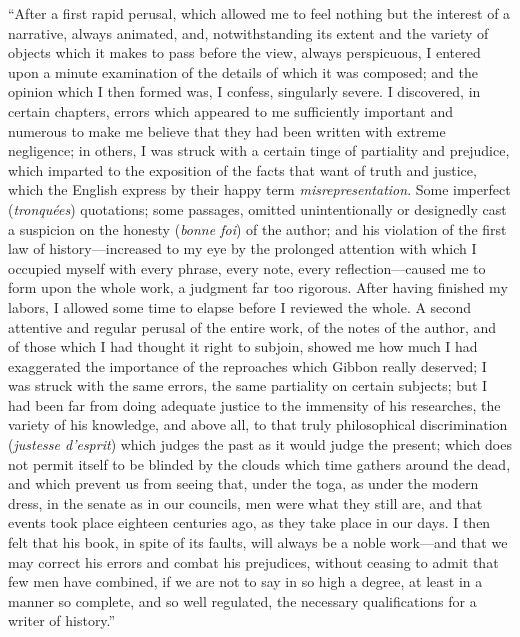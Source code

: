 “After a first rapid perusal, which allowed me to feel nothing but the interest of a narrative, always animated, and, notwithstanding its extent and the variety of objects which it makes to pass before the view, always perspicuous, I entered upon a minute examination of the details of which it was composed; and the opinion which I then formed was, I confess, singularly severe. I discovered, in certain chapters, errors which appeared to me sufficiently important and numerous to make me believe that they had been written with extreme negligence; in others, I was struck with a certain tinge of partiality and prejudice, which imparted to the exposition of the facts that want of truth and justice, which the English express by their happy term \textit{misrepresentation}. Some imperfect (\textit{tronquées}) quotations; some passages, omitted unintentionally or designedly cast a suspicion on the honesty (\textit{bonne foi}) of the author; and his violation of the first law of history—increased to my eye by the prolonged attention with which I occupied myself with every phrase, every note, every reflection—caused me to form upon the whole work, a judgment far too rigorous. After having finished my labors, I allowed some time to elapse before I reviewed the whole. A second attentive and regular perusal of the entire work, of the notes of the author, and of those which I had thought it right to subjoin, showed me how much I had exaggerated the importance of the reproaches which Gibbon really deserved; I was struck with the same errors, the same partiality on certain subjects; but I had been far from doing adequate justice to the immensity of his researches, the variety of his knowledge, and above all, to that truly philosophical discrimination (\textit{justesse d’esprit}) which judges the past as it would judge the present; which does not permit itself to be blinded by the clouds which time gathers around the dead, and which prevent us from seeing that, under the toga, as under the modern dress, in the senate as in our councils, men were what they still are, and that events took place eighteen centuries ago, as they take place in our days. I then felt that his book, in spite of its faults, will always be a noble work—and that we may correct his errors and combat his prejudices, without ceasing to admit that few men have combined, if we are not to say in so high a degree, at least in a manner so complete, and so well regulated, the necessary qualifications for a writer of history.”

